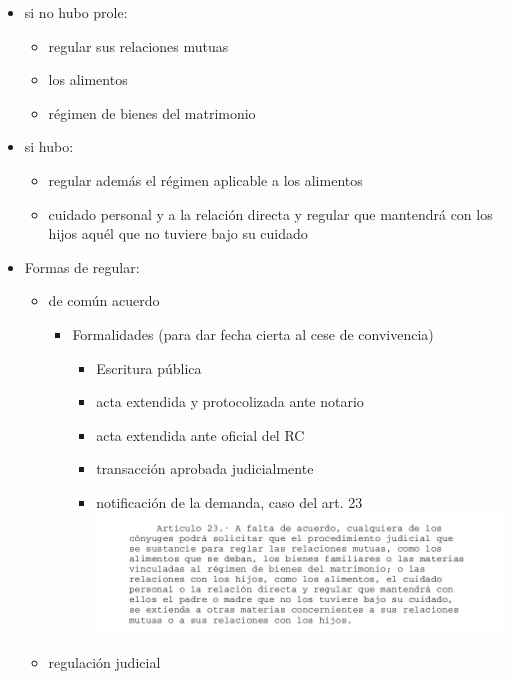 \documentclass[]{article}
\providecommand{\tightlist}{%
  \setlength{\itemsep}{0pt}\setlength{\parskip}{0pt}}
\begin{document}
\begin{itemize}
\begin{itemize}
    \begin{itemize}
    \tightlist
    \item
      si no hubo prole:

      \begin{itemize}
      \tightlist
      \item
        regular sus relaciones mutuas
      \item
        los alimentos
      \item
        régimen de bienes del matrimonio
      \end{itemize}
    \item
      si hubo:

      \begin{itemize}
      \tightlist
      \item
        regular además el régimen aplicable a los alimentos
      \item
        cuidado personal y a la relación directa y regular que mantendrá
        con los hijos aquél que no tuviere bajo su cuidado
      \end{itemize}
    \item
      Formas de regular:

      \begin{itemize}
      \item
        de común acuerdo

        \begin{itemize}
        \item
          Formalidades (para dar fecha cierta al cese de convivencia)

          \begin{itemize}
          \tightlist
          \item
            Escritura pública
          \item
            acta extendida y protocolizada ante notario
          \item
            acta extendida ante oficial del RC
          \item
            transacción aprobada judicialmente
          \item
            notificación de la demanda, caso del art. 23
            \includegraphics{23lmc.png}
          \end{itemize}
        \end{itemize}
      \item
        regulación judicial


\end{itemize}
\end{itemize}
\end{itemize}
\end{itemize}
\end{document}
